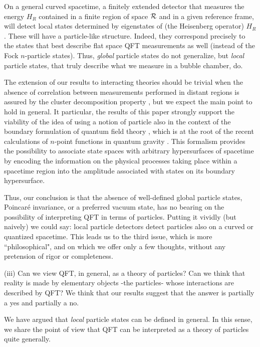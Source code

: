 \documentclass[10pt, nofootinbib]{revtex4}
\begin{document}
On a general curved spacetime, a finitely extended detector that
measures the energy $H_{R}$ contained in a finite region of space
$\cal R$ and in a given reference frame, will detect local states
determined by eigenstates of (the Heisenberg operator) $H_{R}$.  These
will have a particle-like structure.  Indeed, they correspond
precisely to the states that best describe flat space QFT measurements
as well (instead of the Fock $n$-particle states).  Thus,
\emph{global} particle states do not generalize, but \emph{local}
particle states, that truly describe what we measure in a bubble
chamber, do.  

The extension of our results to interacting theories should 
be trivial  when the absence of correlation between 
measurements performed in distant regions is assured by the 
cluster decomposition property \cite{weinberg}, but we expect 
the main point to hold in general. It particular, the results
of this paper strongly support the viability of the idea of using
a notion of particle also in the context of the boundary formulation
of quantum field theory \cite{boundary,book}, which is at the
root of the recent calculations of $n$-point functions in quantum gravity
\cite{transitions}.  This formalism provides the possibility to associate state spaces 
with arbitrary hypersurfaces of spacetime by encoding the information 
on the physical processes taking place within a spacetime region into 
the amplitude associated with states on its boundary hypersurface. 

Thus, our conclusion is that the absence of well-defined global
particle states, Poincar\'e invariance, or a preferred vacuum state,
has no bearing on the possibility of interpreting QFT in terms of
particles.  Putting it vividly (but naively) we could say: local
particle detectors detect particles also on a curved or quantized
spacetime.  This leads us to the third issue, which is more
``philosophical", and on which we offer only a few thoughts, without 
any pretension of rigor or completeness. 

(iii) Can we view QFT, in general, as a theory of particles?  Can we
think that reality is made by elementary objects -the particles- whose
interactions are described by QFT? We think that our results suggest
that the answer is partially a yes and partially a no.  

We have argued that \emph{local} particle states can be defined in
general.  In this sense, we share the point of view that QFT can be
interpreted as a theory of particles quite generally.
\end{document}
